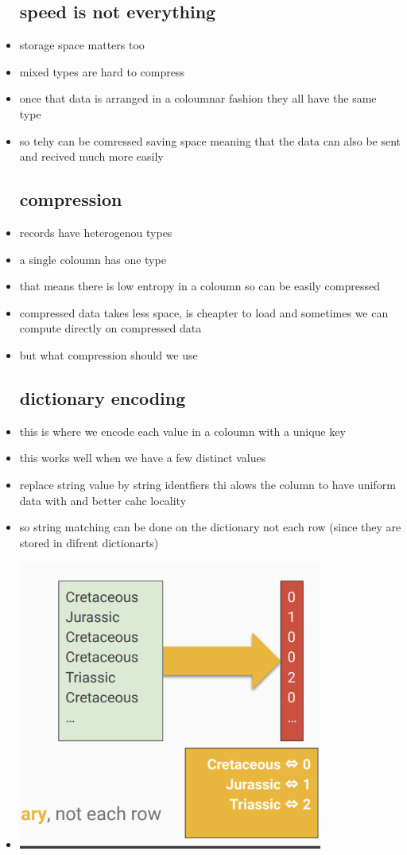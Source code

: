 \documentclass{article}
\begin{document}
\begin{itemize}
\subsection*{speed is not everything}
\item storage space matters too 
\item mixed types are hard to compress 
\item once that data is arranged in a coloumnar fashion they all have the same type 
\item so tehy can be comressed saving space meaning that the data can also be sent and recived much more easily 
\subsection*{compression}
\item records have heterogenou types 
\item a single coloumn has one type 
\item that means there is low entropy in a coloumn so can be easily compressed 
\item compressed data takes less space, is cheapter to load and sometimes we can compute directly on compressed data 
\item but what compression should we use 
\subsection*{dictionary encoding}
\item this is where we encode each value in a coloumn with a unique key 
\item this works well when we have a few distinct values
\item replace string value by string identfiers thi alows the column to have uniform data with and better cahc locality
\item so string matching can be done on the dictionary not each row (since they are stored in difrent dictionarts)
\item \includegraphics*[width=10cm]{images/Screenshot 2023-05-10 at 4.20.28 AM.png}

\end{itemize}
\end{document}
